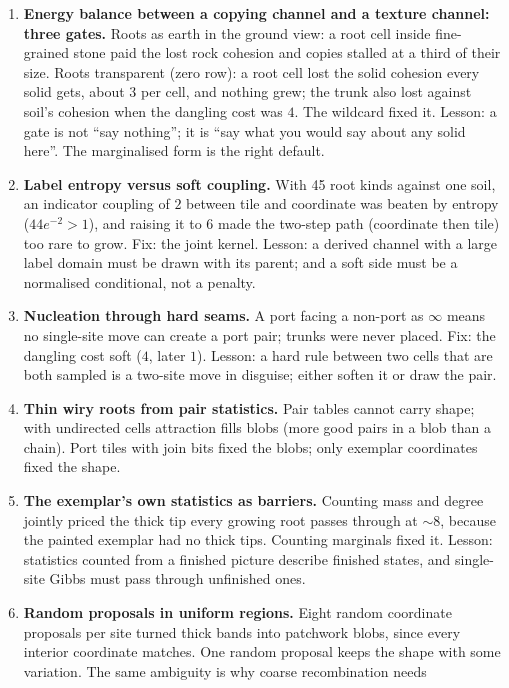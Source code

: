 \documentclass[11pt]{article}
\newcommand{\1}{\mathds{1}}
\begin{document}
\begin{enumerate}
\item \textbf{Energy balance between a copying channel and a texture
  channel: three gates.} Roots as earth in the ground view: a root cell
  inside fine-grained stone paid the lost rock cohesion and copies stalled
  at a third of their size. Roots transparent (zero row): a root cell lost
  the solid cohesion every solid gets, about $3$ per cell, and nothing
  grew; the trunk also lost against soil's cohesion when the dangling cost
  was $4$. The wildcard fixed it. Lesson: a gate is not ``say nothing'';
  it is ``say what you would say about any solid here''. The marginalised
  form is the right default.
\item \textbf{Label entropy versus soft coupling.} With 45 root kinds
  against one soil, an indicator coupling of $2$ between tile and
  coordinate was beaten by entropy ($44 e^{-2} > 1$), and raising it to $6$
  made the two-step path (coordinate then tile) too rare to grow. Fix: the
  joint kernel. Lesson: a derived channel with a large label domain must
  be drawn with its parent; and a soft side must be a normalised
  conditional, not a penalty.
\item \textbf{Nucleation through hard seams.} A port facing a non-port as
  $\infty$ means no single-site move can create a port pair; trunks were
  never placed. Fix: the dangling cost soft ($4$, later $1$). Lesson: a
  hard rule between two cells that are both sampled is a two-site move in
  disguise; either soften it or draw the pair.
\item \textbf{Thin wiry roots from pair statistics.} Pair tables cannot
  carry shape; with undirected cells attraction fills blobs (more good
  pairs in a blob than a chain). Port tiles with join bits fixed the blobs;
  only exemplar coordinates fixed the shape.
\item \textbf{The exemplar's own statistics as barriers.} Counting mass and
  degree jointly priced the thick tip every growing root passes through
  at $\sim 8$, because the painted exemplar had no thick tips. Counting
  marginals fixed it. Lesson: statistics counted from a finished picture
  describe finished states, and single-site Gibbs must pass through
  unfinished ones.
\item \textbf{Random proposals in uniform regions.} Eight random coordinate
  proposals per site turned thick bands into patchwork blobs, since every
  interior coordinate matches. One random proposal keeps the shape with
  some variation. The same ambiguity is why coarse recombination needs

\end{enumerate}
\end{document}
